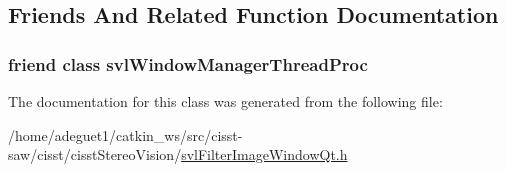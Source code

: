 \subsection{Friends And Related Function Documentation}
\hypertarget{classsvl_filter_image_window_qt_a3da031c59e20922361dc2f6421a036db}{
\subsubsection[{svl\-Window\-Manager\-Thread\-Proc}]{\setlength{\rightskip}{0pt plus 5cm}friend class svl\-Window\-Manager\-Thread\-Proc\hspace{0.3cm}{\ttfamily [friend]}}}\label{classsvl_filter_image_window_qt_a3da031c59e20922361dc2f6421a036db}


The documentation for this class was generated from the following file\-:\begin{DoxyCompactItemize}
\item 
/home/adeguet1/catkin\-\_\-ws/src/cisst-\/saw/cisst/cisst\-Stereo\-Vision/\hyperlink{svl_filter_image_window_qt_8h}{svl\-Filter\-Image\-Window\-Qt.\-h}\end{DoxyCompactItemize}
